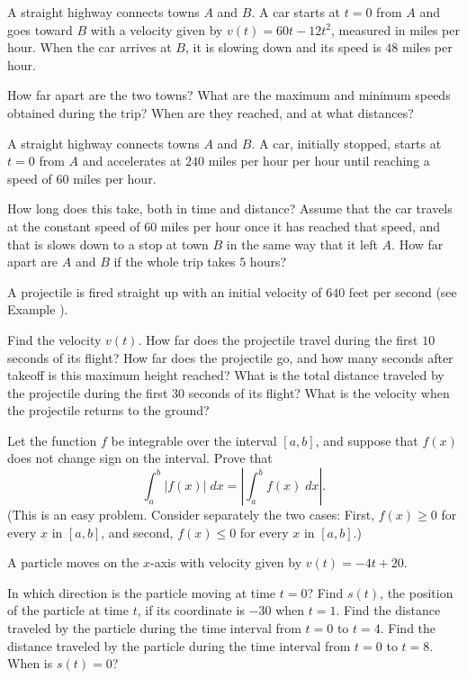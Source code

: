 \begin{exercises}

A straight highway connects towns $A$ and $B$.
A car starts at $t = 0$ from $A$ and goes toward
$B$ with a velocity given by $v(t) = 60t - 12t^2$,
measured in miles per hour.
When the car arrives at $B$,
it is slowing down and its speed is $48$ miles per hour.
\begin{exenum}
\x
How far apart are the two towns?
\x
What are the maximum and minimum
speeds obtained during the trip?
When are they reached,
and at what distances?
\end{exenum}

A straight highway connects towns $A$ and $B$.
A car, initially stopped, starts at $t = 0$ from $A$
and accelerates at $240$ miles per hour per hour until
reaching a speed of $60$ miles per hour.
\begin{exenum}
\x
How long does this take, both in time and distance?
Assume that the car travels at the constant speed of
$60$ miles per hour once it has reached that speed,
and that is slows down to a stop at town $B$ in
the same way that it left $A$.
\x
How far apart are $A$ and $B$ if the whole
trip takes $5$ hours?
\end{exenum}

A projectile is fired straight up with an initial velocity
of $640$ feet per second
(see Example ).
\begin{exenum}
\x
Find the velocity $v(t)$.
\x
How far does the projectile travel during the first
$10$ seconds of its flight?
\x
How far does the projectile go,
and how many seconds after takeoff is this
maximum height reached?
\x
What is the total distance traveled by the projectile
during the first $30$ seconds
of its flight?
\x
What is the velocity when the projectile
returns to the ground?
\end{exenum}

Let the function $f$ be integrable over the
interval $[a,b]$, and suppose that $f(x)$
does not change sign on the interval.
Prove that
\[
\int_a^b |f(x)| \; dx = \left| \int_a^b f(x) \; dx \right|
.
\]
(This is an easy problem.
Consider separately the two cases:
First, $f(x) \geq 0$ for every $x$ in $[a,b]$,
and second, $f(x) \leq 0$ for every $x$
in $[a,b]$.)

A particle moves on the $x$-axis with velocity
given by $v(t) = -4t + 20$.
\begin{exenum}
\x
In which direction is the particle moving at time $t = 0$?
\x
Find $s(t)$, the position of the particle at time $t$,
if its coordinate is $-30$ when $t = 1$.
\x
Find the distance traveled by the particle during
the time interval from $t = 0$ to $t = 4$.
\x
Find the distance traveled by the particle during the
time interval from $t = 0$ to $t = 8$.
\x
When is $s(t) = 0$?
\end{exenum}


\end{exercises}
